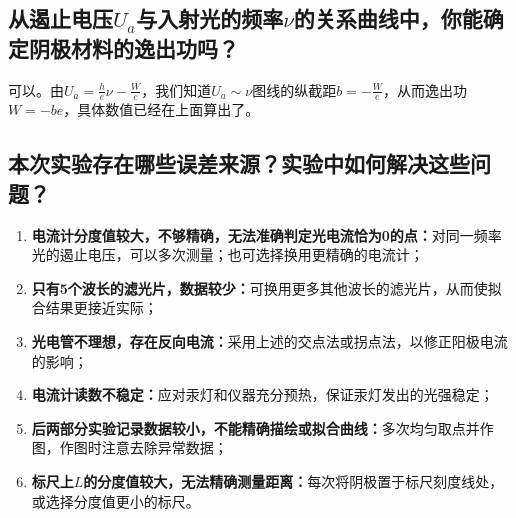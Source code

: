 \documentclass[]{../../templates/Report}%
\begin{document}
\begin{fullreportonly}
\subsection{从遏止电压$U_a$与入射光的频率$\nu$的关系曲线中，你能确定阴极材料的逸出功吗？}
可以。由$U_a = \frac{h}{e} \nu - \frac{W}{e}$，我们知道$U_a \sim \nu$图线的纵截距$b = - \frac{W}{e}$，从而逸出功$W = -be$，具体数值已经在上面算出了。

\subsection{本次实验存在哪些误差来源？实验中如何解决这些问题？}
\begin{enumerate}
    \item \textbf{电流计分度值较大，不够精确，无法准确判定光电流恰为0的点：}对同一频率光的遏止电压，可以多次测量；也可选择换用更精确的电流计；
    \item \textbf{只有5个波长的滤光片，数据较少：}可换用更多其他波长的滤光片，从而使拟合结果更接近实际；
    \item \textbf{光电管不理想，存在反向电流：}采用上述的交点法或拐点法，以修正阳极电流的影响；
    \item \textbf{电流计读数不稳定：}应对汞灯和仪器充分预热，保证汞灯发出的光强稳定；
    \item \textbf{后两部分实验记录数据较小，不能精确描绘或拟合曲线：}多次均匀取点并作图，作图时注意去除异常数据；
    \item \textbf{标尺上$L$的分度值较大，无法精确测量距离：}每次将阴极置于标尺刻度线处，或选择分度值更小的标尺。
\end{enumerate}

\end{fullreportonly}
\insertnotes
\end{document}
